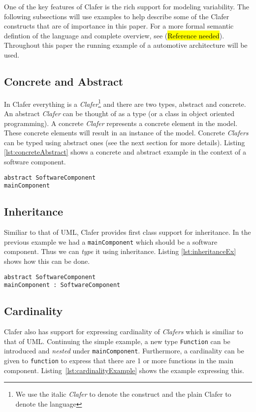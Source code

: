 \documentclass[10pt,oneside]{IEEEtran}
\begin{document}
One of the key features of Clafer is the rich support for modeling variability. The following subsections
will use examples to help describe some of the Clafer constructs that are of importance in this paper.
For a more formal semantic defintion of the language and complete overview, see  (\hl{Reference needed}).
Throughout this paper the running example of a automotive architecture will be used.

\subsection{Concrete and Abstract}
In Clafer everything is a \textit{Clafer}\footnote{We use the italic \textit{Clafer} to denote the construct
and the plain Clafer to denote the language} and there are two types, abstract and concrete. An abstract
\textit{Clafer} can be thought of as a type (or a class in object oriented programming). A concrete
\textit{Clafer} represents a concrete element in the model. These concrete elements will result in an
instance of the model. Concrete \textit{Clafers} can be typed using abstract ones (see the next section
for more details). Listing \ref{lst:concreteAbstract} shows a concrete and abstract example in the
context of a software component.

\begin{lstlisting}[label={lst:concreteAbstract},caption={Example of abstract and concrete \textit{Clafers}}]
abstract SoftwareComponent
mainComponent
\end{lstlisting}

\subsection{Inheritance}
Similiar to that of UML, Clafer provides first class support for inheritance. In the previous
example we had a \lstinline$mainComponent$ which should be a software component. Thus we can
\textit{type} it using inheritance. Listing \ref{lst:inheritanceEx} shows how this can be done.

\begin{lstlisting}[label={lst:inheritanceEx},caption={Inheritance example}]
abstract SoftwareComponent
mainComponent : SoftwareComponent
\end{lstlisting}

\subsection{Cardinality}
Clafer also has support for expressing cardinality of \textit{Clafers} which is similiar to
that of UML. Continuing the simple example, a new type \lstinline$Function$ can be introduced
and \textit{nested} under \lstinline$mainComponent$. Furthermore, a cardinality can be given to
\lstinline$function$ to express that there are 1 or more functions in the main component.
Listing~\ref{lst:cardinalityExample} shows the example expressing this.
\end{document}
